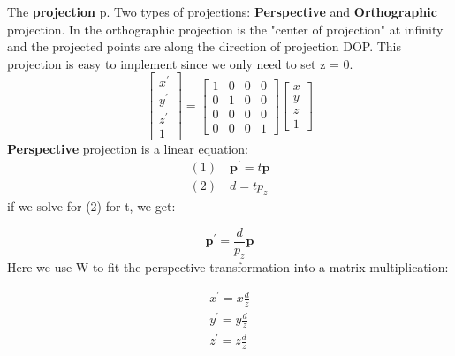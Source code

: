 		\noindent The \textbf{projection} p. Two types of projections: \textbf{Perspective} and \textbf{Orthographic} projection. In the orthographic projection is the "center of projection" at infinity and the projected points are along the direction of projection DOP. This projection is easy to implement since we only need to set z = 0. 
			\begin{equation}
		 		\begin{bmatrix} x^{\prime} \\ y^{\prime} \\z^{\prime} \\ 1 \end{bmatrix} = \begin{bmatrix} 1& 0& 0& 0\\ 
		 		                0& 1& 0& 0\\
		 		                0& 0& 0& 0\\
		 		                0& 0& 0& 1\end{bmatrix} \begin{bmatrix} x \\ y \\ z \\ 1 \end{bmatrix}
		 	\end{equation} 
		 \textbf{Perspective} projection is a linear equation:
			 \begin{equation}
			 \begin{aligned}
			 	(1) \quad \textbf{p}^{\prime} = t \textbf{p} \\
			 	(2) \quad d = tp_z
			 \end{aligned}
			 \end{equation}
		if we solve for  (2) for t, we get:

			\begin{equation}
				\textbf{p}^{\prime} = \frac{d}{p_z} \textbf{p} 
			\end{equation}
		Here we use W to fit the perspective transformation into a matrix multiplication:

			\begin{equation}
			\begin{aligned}
				x^{\prime} = x \frac{d} {z}\\
				y^{\prime} = y \frac{d} {z}\\
				z^{\prime} = z \frac{d} {z}  
			\end{aligned}
			\end{equation}

